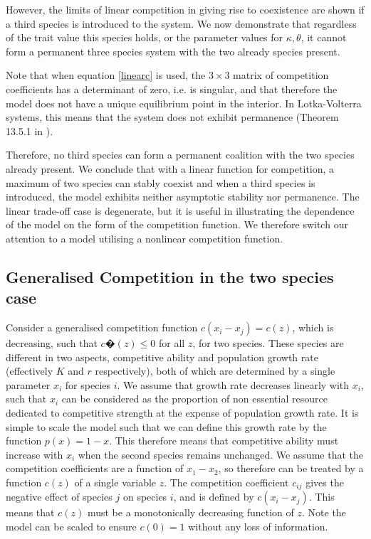However, the limits of linear competition in giving rise to coexistence are shown if a third species is introduced to the system. We now demonstrate that regardless of the trait value this species holds, or the parameter values for $\kappa, \theta$, it cannot form a permanent three species system with the two already species present.  

Note that when equation \eqref{linearc} is used, the $3\times 3$ matrix of competition coefficients has a determinant of zero, i.e. is singular, and that therefore the model does not have a unique equilibrium point in the interior. In Lotka-Volterra systems, this means that the system does not exhibit permanence (Theorem 13.5.1 in \cite{hofandsig}).

Therefore, no third species can form a permanent coalition with the two species already present. We conclude that with a linear function for competition, a maximum of two species can stably coexist and when a third species is introduced, the model exhibits neither asymptotic stability nor permanence. The linear trade-off case is degenerate, but it is useful in illustrating the dependence of the model on the form of the competition function. We therefore switch our attention to a model utilising a nonlinear competition function.

\subsection{Generalised Competition in the two species case}
Consider a generalised competition function $c(x_i - x_j)=c(z)$, which is decreasing, such that $c�(z)\leq0$ for all $z$, for two species. These species are different in two aspects, competitive ability and population growth rate (effectively $K$ and $r$ respectively), both of which are determined by a single parameter $x_i$ for species $i$. We assume that growth rate decreases linearly with $x_i$, such that $x_i$ can be considered as the proportion of non essential resource dedicated to competitive strength at the expense of population growth rate. It is simple to scale the model such that we can define this growth rate by the function $p(x)=1-x$. This therefore means that competitive ability must increase with $x_i$ when the second species remains unchanged. We assume that the competition coefficients are a function of $x_1-x_2$, so therefore can be treated by a function $c(z)$ of a single variable $z$. The competition coefficient $c_{ij}$ gives the negative effect of species $j$ on species $i$, and is defined by $c(x_i-x_j)$. This means that $c(z)$ must be a monotonically decreasing function of $z$. Note the model can be scaled to ensure $c(0)=1$ without any loss of information. 

